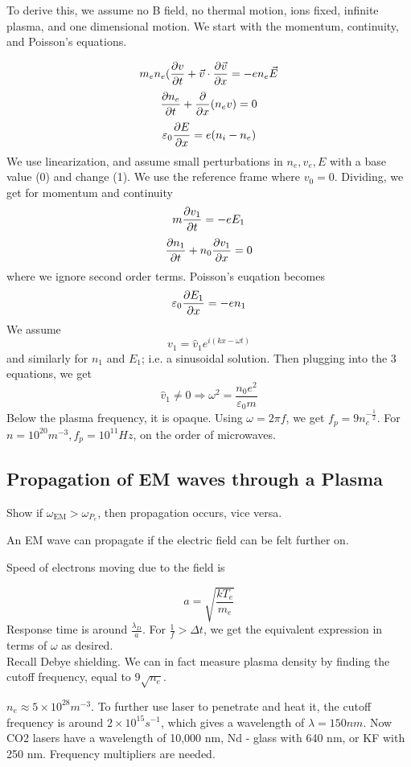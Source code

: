 \documentclass[12pt]{article}
\begin{document}
To derive this, we assume no B field, no thermal motion, ions fixed, infinite plasma, and one dimensional motion. We start with the momentum, continuity, and Poisson's equations.

$$m_en_e(\frac{\partial v}{\partial t} + \vec v \cdot \frac{\partial \vec v}{\partial x} = -en_e \vec E$$
$$\frac{\partial n_e}{\partial t} + \frac{\partial }{\partial x} (n_ev) = 0$$
$$\varepsilon_0 \frac{\partial E}{\partial x} = e(n_i-n_e)$$
We use linearization, and assume small  perturbations in $n_e,v_e,E$ with a base value (0) and change (1). We use the reference frame where $v_0 = 0$. Dividing, we get for momentum and continuity
$$m\frac{\partial v_1}{\partial t} = -eE_1$$
$$\frac{\partial n_1}{\partial t} + n_0\frac{\partial v_1}{\partial x} = 0$$
where we ignore second order terms. Poisson's euqation becomes
$$\varepsilon_0 \frac{\partial E_1}{\partial x} = -en_1$$
We assume
$$v_1 = \hat v_1 e^{i(kx-\omega t)}$$
and similarly for $n_1$ and $E_1$; i.e. a sinusoidal solution. Then plugging into the 3 equations, we get
$$\hat v_1 \neq 0 \Rightarrow \omega^2 = \frac{n_0e^2}{\varepsilon_0m}$$
Below the plasma frequency, it is opaque. Using $\omega = 2\pi f$, we get $f_p = 9n_e^{-\frac{1}{2}}$. For $n = 10^{20}\unit{m^{-3}}, f_p = 10^{11} \unit{Hz}$, on the order of microwaves.

\subsection{Propagation of EM waves through a Plasma}

Show if $\omega_{\text{EM}} > \omega_{P_e}$, then propagation occurs, vice versa.

\begin{defn}
    An EM wave can propagate if the electric field can be felt further on.
\end{defn}

Speed of electrons moving due to the field is

$$a = \sqrt{\frac{kT_e}{m_e}}$$
Response time is around $\frac{\lambda_D}{a}$. For $\frac{1}{f} > \Delta t$, we get the equivalent expression in terms of $\omega$ as desired. \\

Recall Debye shielding. We can in fact measure plasma density by finding the cutoff frequency, equal to $9\sqrt{n_e}$.

\begin{ex}
    $n_e \approx 5 \times 10^{28} \unit{m^{-3}}$. To further use laser to penetrate and heat it, the cutoff frequency is around $2 \times 10^{15}\unit{s^{-1}}$, which gives a wavelength of $\lambda = 150\unit{nm}$. Now CO2 lasers have a wavelength of 10,000 nm, Nd - glass with 640 nm, or KF with 250 nm. Frequency multipliers are needed.
\end{ex}
\end{document}
